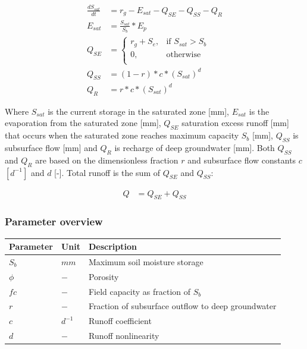 \begin{align}
	\frac{dS_{sat}}{dt} &= r_g - E_{sat} - Q_{SE} - Q_{SS} - Q_{R}\\
	E_{sat} &= \frac{S_{sat}}{S_b}*E_p\\
	Q_{SE} &= \begin{cases}
		r_g+S_e, &\text{if } S_{sat} > S_b \\
		0, & \text{otherwise} \\
	\end{cases} \\
	Q_{SS} &= (1-r)*c*\left(S_{sat}\right)^d\\
	Q_{R} &= r*c*\left(S_{sat}\right)^d
\end{align}

Where $S_{sat}$ is the current storage in the saturated zone [mm], $E_{sat}$ is the evaporation from the saturated zone [mm], $Q_{SE}$ saturation excess runoff [mm] that occurs when the saturated zone reaches maximum capacity $S_b$ [mm], $Q_{SS}$ is subsurface flow [mm] and $Q_R$ is recharge of deep groundwater [mm]. Both $Q_{SS}$ and $Q_R$ are based on the dimensionless fraction $r$ and subsurface flow constants $c$ $[d^{-1}]$ and $d$ [-]. Total runoff is the sum of $Q_{SE}$ and $Q_{SS}$:

\begin{align}
	Q &= Q_{SE} + Q_{SS}
\end{align}

\subsubsection{Parameter overview}
\begin{table}[htbp]
  \centering
    \begin{tabular}{lll}
    \toprule
    Parameter & Unit  & Description \\
    \midrule
    $S_b$ & $mm$  & Maximum soil moisture storage \\
    $\phi$ & $-$   & Porosity \\
    $fc$  & $-$   & Field capacity as fraction of $S_b$ \\
    $r$   & $-$   & Fraction of subsurface outflow to deep groundwater \\
    $c$   & $d^{-1}$ & Runoff coefficient \\
    $d$   & $-$   & Runoff nonlinearity \\
    \bottomrule
    \end{tabular}%
  \label{tab:addlabel}%
\end{table}%

